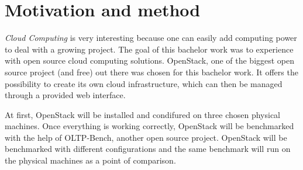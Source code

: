 \section{Motivation and method}
\textit{Cloud Computing} is very interesting because one can easily add computing power to deal with a growing project. 
The goal of this bachelor work was to experience with open source cloud computing solutions. 
OpenStack, one of the biggest open source project (and free) out there was chosen for this bachelor work. 
It offers the possibility to create its own cloud infrastructure, which can then be managed through a provided web interface.

At first, OpenStack will be installed and condifured on three chosen physical machines. 
Once everything is working correctly, OpenStack will be benchmarked with the help of OLTP-Bench, another open source project. 
OpenStack will be benchmarked with different configurations and the same benchmark will run on the physical machines as a point of comparison.


